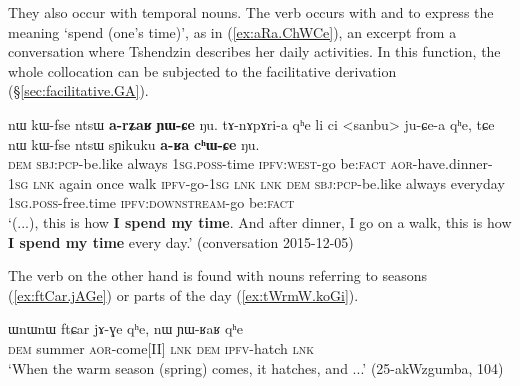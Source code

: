 They also occur with temporal nouns. The verb  occurs with  and  to express the meaning `spend (one's time)', as in (\ref{ex:aRa.ChWCe}), an excerpt from a conversation where Tshendzin describes her daily activities. In this function, the whole collocation can be subjected to the facilitative  derivation (§\ref{sec:facilitative.GA}).  


\begin{exe}
\ex \label{ex:aRa.ChWCe}
\gll nɯ kɯ-fse ntsɯ \textbf{a-rʑaʁ} \textbf{ɲɯ-ɕe} ŋu. tɤ-nɤpɤri-a qʰe li ci <sanbu> ju-ɕe-a qʰe, tɕe nɯ kɯ-fse ntsɯ sɲikuku \textbf{a-ʁa} \textbf{cʰɯ-ɕe} ŋu. \\
\textsc{dem} \textsc{sbj}:\textsc{pcp}-be.like always \textsc{1sg}.\textsc{poss}-time \textsc{ipfv}:\textsc{west}-go be:\textsc{fact} \textsc{aor}-have.dinner-\textsc{1sg} \textsc{lnk} again once walk \textsc{ipfv}-go-\textsc{1sg} \textsc{lnk} \textsc{lnk} \textsc{dem} \textsc{sbj}:\textsc{pcp}-be.like always everyday \textsc{1sg}.\textsc{poss}-free.time \textsc{ipfv}:\textsc{downstream}-go be:\textsc{fact} \\
\glt `(...), this is how \textbf{I spend my time}. And after dinner, I go on a walk, this is how \textbf{I spend my time} every day.' (conversation 2015-12-05)
\end{exe}
 
 The verb  on the other hand is found with nouns referring to seasons (\ref{ex:ftCar.jAGe}) or parts of the day (\ref{ex:tWrmW.koGi}).
 
\begin{exe}
\ex \label{ex:ftCar.jAGe}
\gll  ɯnɯnɯ ftɕar jɤ-ɣe qʰe, nɯ ɲɯ-ʁaʁ qʰe \\
\textsc{dem} summer \textsc{aor}-come[II] \textsc{lnk} \textsc{dem} \textsc{ipfv}-hatch \textsc{lnk} \\
\glt `When the warm season (spring) comes, it hatches, and ...' (25-akWzgumba, 104)
\end{exe}

